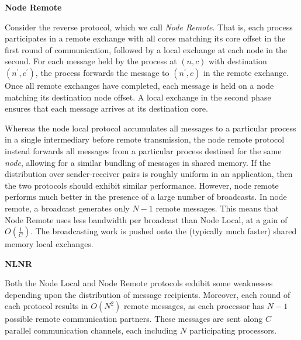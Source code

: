 \documentclass[10]{report}
\begin{document}
\bigskip
\noindent
\textbf{Node Remote}

\noindent
Consider the reverse protocol, which we call \emph{Node Remote}.
That is, each process participates in a remote exchange with all cores matching its core offset in the first round of communication, followed by a local exchange at each node in the second. 
For each message held by the process at $(n, c)$ with destination $(n^\prime, c^\prime)$, the process forwards the message to $(n^\prime, c)$ in the remote exchange.
Once all remote exchanges have completed, each message is held on a node matching its destination node offset. 
A local exchange in the second phase ensures that each message arrives at its destination core. 

Whereas the node local protocol accumulates all messages to a particular process in a single intermediary before remote transmission, the node remote protocol instead forwards all messages from a particular process destined for the same \emph{node}, allowing for a similar bundling of messages in shared memory.
If the distribution over sender-receiver pairs is roughly uniform in an application, then the two protocols should exhibit similar performance.
However, node remote performs much better in the presence of a large number of broadcasts. 
In node remote, a broadcast generates only $N-1$ remote messages.
This means that Node Remote uses less bandwidth per broadcast than Node Local, at a gain of $O \left (\frac{1}{C} \right )$.
The broadcasting work is pushed onto the (typically much faster) shared memory local exchanges. 

\bigskip
\noindent
\textbf{NLNR}

\noindent
Both the Node Local and Node Remote protocols exhibit some weaknesses depending upon the distribution of message recipients.
Moreover, each round of each protocol results in $O \left (N^2 \right )$ remote messages, as each processor has $N-1$ possible remote communication partners.
These messages are sent along $C$ parallel communication channels, each including $N$ participating processors.
\end{document}

